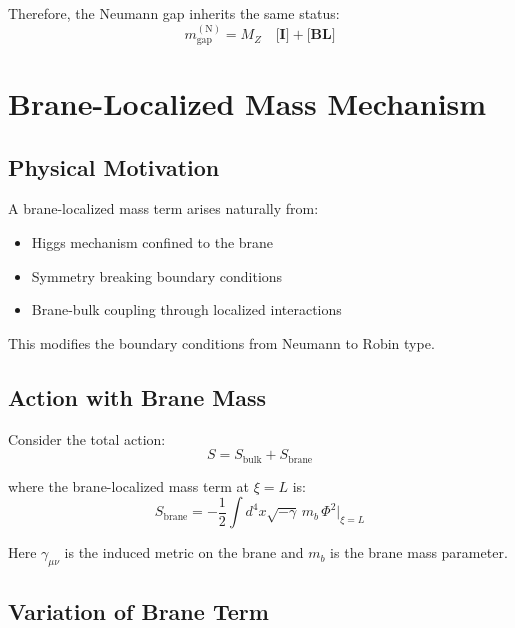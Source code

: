 \documentclass[11pt,a4paper]{article}
\newcommand{\mgap}{m_{\mathrm{gap}}}
\newcommand{\mb}{m_b}
\newcommand{\MZ}{M_Z}
\newcommand{\tagI}{\textbf{[I]}}
\newcommand{\tagBL}{\textbf{[BL]}}
\theoremstyle{definition}
\theoremstyle{plain}
\theoremstyle{remark}
\begin{document}
Therefore, the Neumann gap inherits the same status:
\begin{equation}
\mgap^{\mathrm{(N)}} = \MZ \quad \tagI{}+\tagBL{}
\label{eq:gap-status-neumann}
\end{equation}

\section{Brane-Localized Mass Mechanism}
\label{sec:brane-mass}

\subsection{Physical Motivation}

A brane-localized mass term arises naturally from:
\begin{itemize}
\item Higgs mechanism confined to the brane
\item Symmetry breaking boundary conditions
\item Brane-bulk coupling through localized interactions
\end{itemize}

This modifies the boundary conditions from Neumann to Robin type.

\subsection{Action with Brane Mass}

Consider the total action:
\begin{equation}
S = S_{\mathrm{bulk}} + S_{\mathrm{brane}}
\label{eq:total-action}
\end{equation}

where the brane-localized mass term at $\xi = L$ is:
\begin{equation}
\boxed{S_{\mathrm{brane}} = -\frac{1}{2}\int d^4x \sqrt{-\gamma} \, \mb\, \Phi^2\big|_{\xi=L}}
\label{eq:brane-action}
\end{equation}

Here $\gamma_{\mu\nu}$ is the induced metric on the brane and $\mb$ is the brane mass parameter.

\subsection{Variation of Brane Term}
\end{document}
